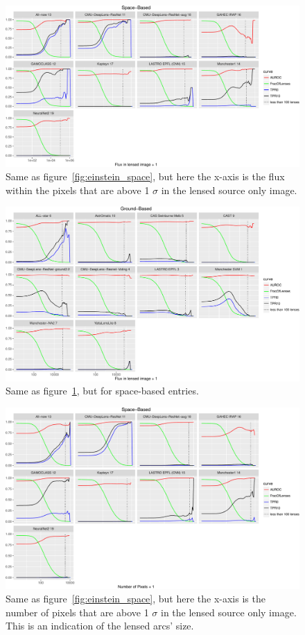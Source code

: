 \documentclass[useAMS,usenatbib]{mnras}
\begin{document}
\begin{figure}
 \includegraphics[width=2\columnwidth]{figures/flux_space.pdf}
 \caption{Same as figure~\ref{fig:einstein_space}, but here the x-axis is the flux within the pixels that are above 1 $\sigma$ in the lensed source only image.}
 \label{fig:flux_space}
\end{figure}

\begin{figure}
 \includegraphics[width=2\columnwidth]{figures/flux_ground.pdf}
 \caption{Same as figure~\ref{fig:flux_space}, but for space-based entries.}
 \label{fig:flux_ground}
\end{figure}

\begin{figure}
\includegraphics[width=2\columnwidth]{figures/npixel_space.pdf}
 \caption{Same as figure~\ref{fig:einstein_space}, but here the x-axis is the number of pixels that are above 1 $\sigma$ in the lensed source only image.  This is an indication of the lensed arcs' size.}
 \label{fig:npixel_space}
\end{figure}
\end{document}
